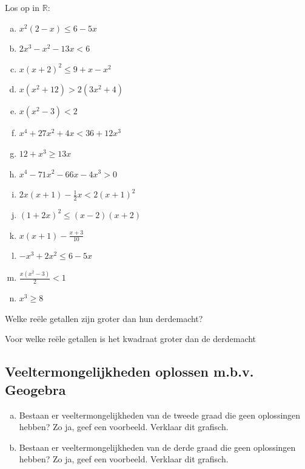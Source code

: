 \documentclass[12pt]{article}
\begin{document}
\begin{oefening}
  Los op in $\mathbb{R}$:
  \begin{multicols}{2}
    \begin{enumerate}[(a)]
      \itemsep0.6em
    \item $x^2(2-x)\leq6-5x$
    \item $2x^3-x^2-13x<6$
    \item $x(x+2)^2\leq9+x-x^2$
    \item $x(x^2+12)>2(3x^2+4)$
    \item $x(x^2-3)<2$
    \item $x^4+27x^2+4x<36+12x^3$
    \item $12+x^3\geq13x$
    \item $x^4-71x^2-66x-4x^3>0$
    \item $2x(x+1)-\frac{1}{2}x<2(x+1)^2$
    \item $(1+2x)^2\leq(x-2)(x+2)$
    \item $x(x+1)-\frac{x+3}{10}$
    \item $-x^3+2x^2\leq6-5x$
    \item $\frac{x(x^2-3)}{2}<1$
    \item $x^3\geq8$
    \end{enumerate}
  \end{multicols}
\end{oefening}

\begin{oefening}
  Welke reële getallen zijn groter dan hun derdemacht?
\end{oefening}

\begin{oefening}
  Voor welke reële getallen is het kwadraat groter dan de derdemacht
\end{oefening}


\subsection{Veeltermongelijkheden oplossen m.b.v. Geogebra}

\begin{oefening}
  \begin{enumerate}[(a)]
  \item Bestaan er veeltermongelijkheden van de tweede graad die geen
    oplossingen hebben? Zo ja, geef een voorbeeld. Verklaar dit
    grafisch.
  \item Bestaan er veeltermongelijkheden van de derde graad die geen
    oplossingen hebben? Zo ja, geef een voorbeeld. Verklaar dit
    grafisch.
  \end{enumerate}
\end{oefening}
\end{document}
